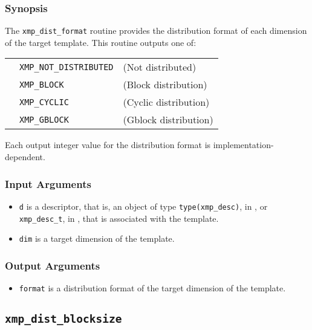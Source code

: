 \subsubsection*{Synopsis}

The {\tt xmp\_dist\_format} routine provides the distribution format of each dimension of the target template.
 This routine outputs one of:

\begin{tabular}{lll}
       \hspace{2.5cm} & {\tt XMP\_NOT\_DISTRIBUTED} & (Not distributed)\\
                      & {\tt XMP\_BLOCK}  & (Block distribution) \\
                      & {\tt XMP\_CYCLIC} & (Cyclic distribution) \\
                      & {\tt XMP\_GBLOCK} & (Gblock distribution) \\
\end{tabular}

  Each output integer value for the distribution format is implementation-dependent.


\subsubsection*{Input Arguments}
\begin{itemize}
 \item {\tt d} is a descriptor, that is, an object of type 
       {\tt type(xmp\_desc)}, in {\XMPF}, or {\tt xmp\_desc\_t},
       in {\XMPC}, that is associated with the template.
        \item {\tt dim} is a target dimension of the template.
\end{itemize}

\subsubsection*{Output Arguments}
\begin{itemize}
 \item {\tt format} is a distribution format of the target dimension of the template.
\end{itemize}


\subsection{\tt xmp\_dist\_blocksize}

